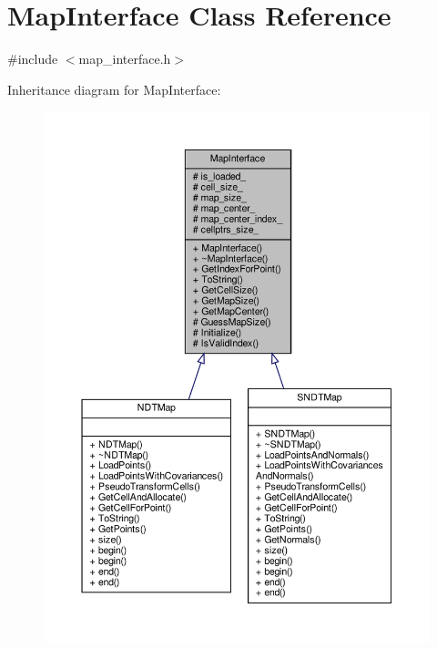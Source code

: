 \hypertarget{classMapInterface}{}\section{Map\+Interface Class Reference}
\label{classMapInterface}


{\ttfamily \#include $<$map\+\_\+interface.\+h$>$}



Inheritance diagram for Map\+Interface\+:\nopagebreak
\begin{figure}[H]
\begin{center}
\leavevmode
\includegraphics[width=350pt]{da/d61/classMapInterface__inherit__graph}
\end{center}
\end{figure}


